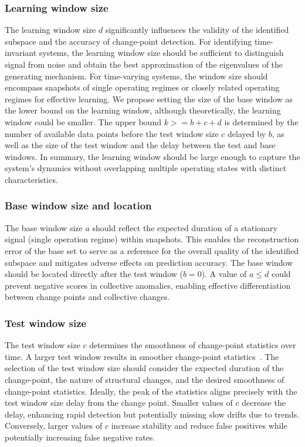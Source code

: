 \subsubsection{Learning window size}
The learning window size \(d\) significantly influences the validity of the identified subspace and the accuracy of change-point detection. For identifying time-invariant systems, the learning window size should be sufficient to distinguish signal from noise and obtain the best approximation of the eigenvalues of the generating mechanism. For time-varying systems, the window size should encompass snapshots of single operating regimes or closely related operating regimes for effective learning. We propose setting the size of the base window as the lower bound on the learning window, although theoretically, the learning window could be smaller. The upper bound \(k >= b + c + d\) is determined by the number of available data points before the test window size \(c\) delayed by \(b\), as well as the size of the test window and the delay between the test and base windows. In summary, the learning window should be large enough to capture the system's dynamics without overlapping multiple operating states with distinct characteristics.

\subsubsection{Base window size and location}\label{sec:base-window}
The base window size \(a\) should reflect the expected duration of a stationary signal (single operation regime) within snapshots. This enables the reconstruction error of the base set to serve as a reference for the overall quality of the identified subspace and mitigates adverse effects on prediction accuracy. The base window should be located directly after the test window (\(b = 0\)). A value of \(a \leq d\) could prevent negative scores in collective anomalies, enabling effective differentiation between change points and collective changes.

\subsubsection{Test window size}
The test window size \(c\) determines the smoothness of change-point statistics over time. A larger test window results in smoother change-point statistics~\citep{Moskvina2003}. The selection of the test window size should consider the expected duration of the change-point, the nature of structural changes, and the desired smoothness of change-point statistics. Ideally, the peak of the statistics aligns precisely with the test window size delay from the change point. Smaller values of \(c\) decrease the delay, enhancing rapid detection but potentially missing slow drifts due to trends. Conversely, larger values of \(c\) increase stability and reduce false positives while potentially increasing false negative rates.

